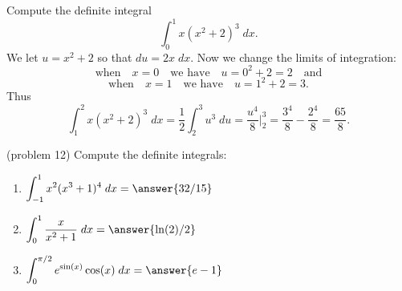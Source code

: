 \documentclass[handout]{ximera}
\begin{document}
\begin{example}[example12]
Compute the definite integral 
\[
\int_0^1 x(x^2 + 2)^3 \; dx.
\]
We let $u = x^2 + 2$ so that $du = 2x \; dx$. Now we change the limits of integration: 
\[
\text{when} \quad x = 0 \quad \text{we have} \quad u = 0^2 + 2 = 2  \quad \text{and}
\]
\[ 
\text{when} \quad x = 1 \quad \text{we have} \quad u = 1^2 + 2 = 3.
\]
Thus
\[
\int_1^2 x(x^2 + 2)^3 \; dx = \frac12 \int_2^3 u^3 \; du = \frac{u^4}{8}\bigg|_2^3 = \frac{3^4}{8} - \frac{2^4}{8} = \frac{65}{8}.
\]
\end{example}

\begin{problem}(problem 12) Compute the definite integrals:
\begin{enumerate}
\item[12a)] \; $\displaystyle{\int_{-1}^1 x^2(x^3 + 1)^4 \; dx = \answer{32/15}}$
\item[12b)] \; $\displaystyle{\int_0^1 \frac{x}{x^2 + 1}\; dx = \answer{\ln(2)/2}}$
\item[12c)] \; $\displaystyle{\int_0^{\pi/2} e^{\sin(x)} \cos(x) \; dx = \answer{e-1}}$
\end{enumerate}
\end{problem}
\end{document}
